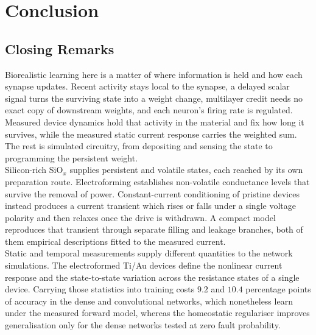 
\chapter{Conclusion}
\label{ch:conclusion}

\section[Closing Remarks]{Closing Remarks}
\label{sec:8p1}


\noindent Biorealistic learning here is a matter of where information is held and how each synapse updates. Recent
activity stays local to the synapse, a delayed scalar signal turns the surviving state into a weight change, multilayer
credit needs no exact copy of downstream weights, and each neuron's firing rate is regulated. Measured device dynamics
hold that activity in the material and fix how long it survives, while the measured static current response carries the
weighted sum. The rest is simulated circuitry, from depositing and sensing the state to programming the persistent
weight.\\


\noindent Silicon-rich SiO$_x$ supplies persistent and volatile states, each reached by its own preparation route.
Electroforming establishes non-volatile conductance levels that survive the removal of power. Constant-current
conditioning of pristine devices instead produces a current transient which rises or falls under a single
voltage polarity and then relaxes once the drive is withdrawn. A compact model reproduces that
transient through separate filling and leakage branches, both of them empirical descriptions fitted to the measured
current.\\

\noindent Static and temporal measurements supply different quantities to the network simulations. The electroformed
Ti/Au devices define the nonlinear current response and the state-to-state variation across the resistance states of a
single device. Carrying those statistics into training costs $9.2$ and $10.4$ percentage points of accuracy in the
dense and convolutional networks, which nonetheless learn under the measured forward model, whereas the homeostatic
regulariser improves generalisation only for the dense networks tested at zero fault probability.\\

